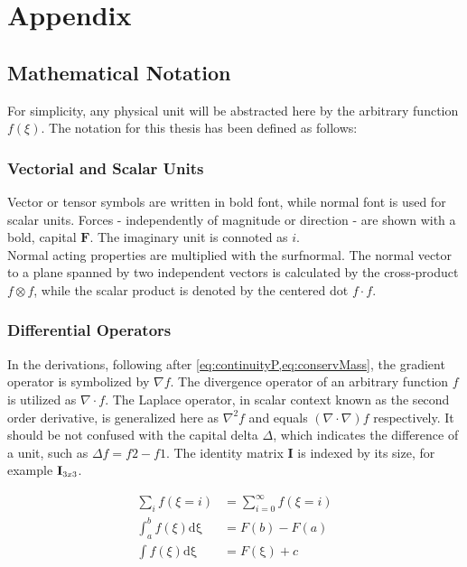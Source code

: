 \chapter{Appendix}

\section{Mathematical Notation}
\label{sec:app:mathnot}
For simplicity, any physical unit will be abstracted here by the arbitrary function $f(\xi)$.
The notation for this thesis has been defined as follows: 
\subsection{Vectorial and Scalar Units}
Vector or tensor symbols are written in bold font, while normal font is used for scalar units. Forces - independently of magnitude or direction - are shown with a bold, capital $\mathbf{F}$. The imaginary unit is connoted as $i$.\\ Normal acting properties are multiplied with the \acrfull{surfnormal}. The normal vector to a plane spanned by two independent vectors is calculated by the cross-product $f \otimes f$, while the scalar product is denoted by the centered dot $f \cdot f$.
\subsection{Differential Operators}
In the derivations, following after \cref{eq:continuityP,eq:conservMass}, the gradient operator is symbolized by $\nabla f$. The divergence operator of an arbitrary function $f$ is utilized as $\nabla\cdot f$. The Laplace operator, in scalar context known as the second order derivative, is generalized here as $\nabla^2 f$ and equals $(\nabla\cdot\nabla) f$ respectively. It should be not confused with the capital delta $\Delta$, which indicates the difference of a unit, such as $\Delta f = f{2} - f{1}$. The identity matrix $\mathbf{I}$ is indexed by its size, for example $\mathbf{I}_\text{\scaleto{3x3}{4pt}}$. 

\begin{align}
	\sum_{i} f(\xi = i)&= \sum_{i = 0}^{\infty} f(\xi = i) \label{eq:app:sum}\\
	\int_{a}^{b} f(\xi) \mathrm{d\xi} &= F(b) - F(a) \label{eq:app:intDef}\\
	\int f(\xi) \mathrm{d\xi}&= F(\mathrm{\xi}) + c \label{eq:app:intIndef}
\end{align}

